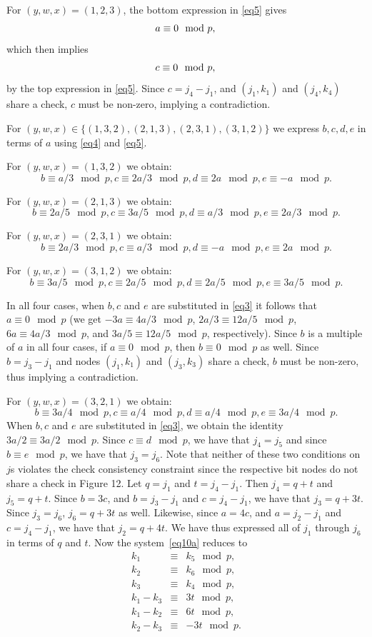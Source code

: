 For $(y,w,x)=(1,2,3)$, the bottom expression in \eqref{eq5} gives
\[
a \equiv 0 \mod p,\\
\]
which then implies
\[
c\equiv 0 \mod p,\\
\]
by the top expression in \eqref{eq5}. Since $c=j_4-j_1$, and
$(j_1,k_1)$ and $(j_4,k_4)$ share a check, $c$ must be non-zero,
implying a contradiction.

For $(y,w,x) \in \{ (1,3,2), (2,1,3), (2,3,1),(3,1,2)\}$ we express
$b,c,d,e$ in terms of $a$ using \eqref{eq4} and \eqref{eq5}.

For $(y,w,x)=(1,3,2)$ we obtain: \[b \equiv a/3 \mod p, c \equiv2a/3
\mod p, d \equiv 2a \mod p, e \equiv -a \mod p.\]

For $(y,w,x)=(2,1,3)$ we obtain: \[b \equiv 2a/5 \mod p, c \equiv
3a/5 \mod p, d \equiv a/3 \mod p, e \equiv 2a/3 \mod p.\]

For $(y,w,x)=(2,3,1)$ we obtain: \[b \equiv 2a/3 \mod p, c \equiv
a/3 \mod p, d \equiv -a \mod p, e \equiv 2a \mod p.\]

For $(y,w,x)=(3,1,2)$ we obtain: \[b \equiv 3a/5 \mod p, c \equiv
2a/5 \mod p, d \equiv 2a/5 \mod p, e \equiv 3a/5 \mod p.\]

In all four cases, when $b,c$ and $e$ are substituted in \eqref{eq3}
it follows that $a \equiv 0 \mod p$ (we get $-3a \equiv 4a/3 \mod
p$, $2a/3 \equiv 12a/5 \mod p$, $6a \equiv 4a/3 \mod p$, and $3a/5
\equiv 12a/5 \mod p$, respectively). Since $b$ is a multiple of $a$
in all four cases, if $a \equiv 0 \mod p$, then $b \equiv 0 \mod p$
as well. Since $b=j_3-j_1$ and nodes $(j_1,k_1)$ and $(j_3,k_3)$
share a check, $b$ must be non-zero, thus implying a contradiction.

For $(y,w,x)=(3,2,1)$ we obtain: \[b \equiv 3a/4 \mod p, c \equiv
a/4 \mod p, d \equiv a/4 \mod p, e \equiv 3a/4 \mod p.\] When $b,c$
and $e$ are substituted in \eqref{eq3}, we obtain the identity $3a/2
\equiv 3a/2 \mod p$. Since $c \equiv d \mod p$, we have that
$j_4=j_5$ and since $b \equiv e \mod p$, we have that $j_3=j_6$.
Note that neither of these two conditions on $j$s violates the check
consistency constraint since the respective bit nodes do not share a
check in Figure 12. Let $q=j_1$ and $t=j_4 -j_1$. Then $j_4=q+t$ and
$j_5=q+t$. Since $b=3c$, and $b=j_3-j_1$ and $c=j_4-j_1$, we have
that $j_3=q+3t$. Since $j_3=j_6$, $j_6=q+3t$ as well. Likewise,
since $a=4c$, and $a=j_2-j_1$ and $c=j_4-j_1$, we have that
$j_2=q+4t$. We have thus expressed all of $j_1$ through $j_6$ in
terms of $q$ and $t$. Now the system~\eqref{eq10a} reduces to
\begin{equation}\label{eq6}\begin{array}{ccc}
k_1 &\equiv& k_5 \mod p,\\
k_2 &\equiv& k_6 \mod p,\\
k_3 &\equiv& k_4 \mod p,\\
k_1 -k_3 &\equiv& 3t \mod p,\\
k_1 -k_2 &\equiv& 6t \mod p,\\
k_2 -k_3 &\equiv& -3t \mod p.\\
\end{array}\end{equation}

